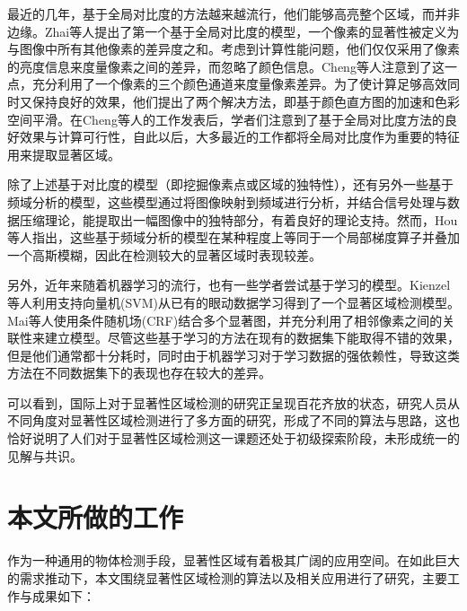 最近的几年，基于全局对比度的方法越来越流行，他们能够高亮整个区域，而并非边缘。Zhai等人\cite{zhai2006visual}提出了第一个基于全局对比度的模型，一个像素的显著性被定义为与图像中所有其他像素的差异度之和。考虑到计算性能问题，他们仅仅采用了像素的亮度信息来度量像素之间的差异，而忽略了颜色信息。Cheng等人\cite{cheng2011global}注意到了这一点，充分利用了一个像素的三个颜色通道来度量像素差异。为了使计算足够高效同时又保持良好的效果，他们提出了两个解决方法，即基于颜色直方图的加速和色彩空间平滑。在Cheng等人的工作发表后，学者们注意到了基于全局对比度方法的良好效果与计算可行性，自此以后，大多最近的工作都将全局对比度作为重要的特征用来提取显著区域。

除了上述基于对比度的模型（即挖掘像素点或区域的独特性），还有另外一些基于频域分析的模型\cite{achanta2009frequency}\cite{hou2007saliency}\cite{hou2012image}，这些模型通过将图像映射到频域进行分析，并结合信号处理与数据压缩理论，能提取出一幅图像中的独特部分，有着良好的理论支持。然而，Hou等人\cite{hou2012image}指出，这些基于频域分析的模型在某种程度上等同于一个局部梯度算子并叠加一个高斯模糊，因此在检测较大的显著区域时表现较差。

另外，近年来随着机器学习的流行，也有一些学者尝试基于学习的模型。Kienzel等人\cite{kienzle2007nonparametric}利用支持向量机(SVM)从已有的眼动数据学习得到了一个显著区域检测模型。Mai等人\cite{maisaliency}使用条件随机场(CRF)结合多个显著图，并充分利用了相邻像素之间的关联性来建立模型。尽管这些基于学习的方法在现有的数据集下能取得不错的效果，但是他们通常都十分耗时，同时由于机器学习对于学习数据的强依赖性，导致这类方法在不同数据集下的表现也存在较大的差异。

可以看到，国际上对于显著性区域检测的研究正呈现百花齐放的状态，研究人员从不同角度对显著性区域检测进行了多方面的研究，形成了不同的算法与思路，这也恰好说明了人们对于显著性区域检测这一课题还处于初级探索阶段，未形成统一的见解与共识。

\section{本文所做的工作}
作为一种通用的物体检测手段，显著性区域有着极其广阔的应用空间\cite{tsai2012hierarchical}\cite{fang2012effective}\cite{deigmoeller2010context}\cite{jiang2011automatic}。在如此巨大的需求推动下，本文围绕显著性区域检测的算法以及相关应用进行了研究，主要工作与成果如下：

